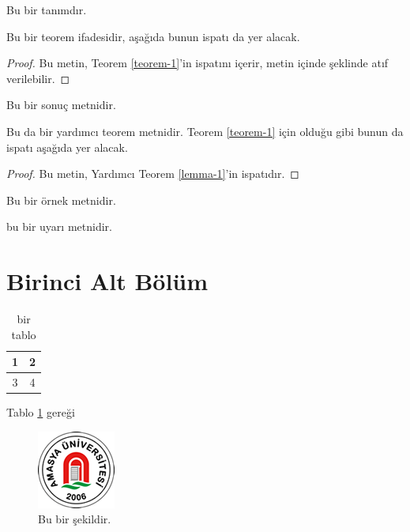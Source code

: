 \documentclass[
oneside, %
doktora, %
]{aufbetez} %
\begin{document}
\begin{definition}
	\label{tanim-1}
	Bu bir tanımdır.
\end{definition}

\begin{theorem}
	\label{teorem-1}
	Bu bir teorem ifadesidir, aşağıda bunun ispatı da yer alacak.
\end{theorem}

\begin{proof}
	Bu metin, Teorem \ref{teorem-1}'in ispatını içerir, metin içinde \cite{ogrekci18} şeklinde atıf verilebilir.
\end{proof}

\begin{corollary}
	\label{sonuc-1}
	Bu bir sonuç metnidir.
\end{corollary}

\begin{lemma}
	\label{lemma-1}
	Bu da bir yardımcı teorem metnidir. Teorem \ref{teorem-1} için olduğu gibi bunun da ispatı aşağıda yer alacak.
\end{lemma}

\begin{proof}
	Bu metin, Yardımcı Teorem \ref{lemma-1}'in ispatıdır.
\end{proof}


\begin{example}
	\label{ornek-1}
	Bu bir örnek metnidir.
\end{example}

\begin{remark}
	\label{uyari-1}
	bu bir uyarı metnidir.
\end{remark}

\section{Birinci Alt Bölüm}
\lipsum

\begin{table}[htbp]
\begin{center}
		\begin{tabular}{|c|c|}
	\hline 
	1 & 2 \\ 
	\hline 
	3 & 4 \\ 
	\hline 
\end{tabular}
\end{center}
\caption{bir tablo\label{tablo-1}}
\end{table}

Tablo \ref{tablo-1} gereği \lipsum[2]

\begin{figure}[htbp]
	\centering
	\includegraphics[scale=3.5]{logo}
	\caption{Bu bir şekildir.}
	\label{sekil-1}
\end{figure}
\end{document}
